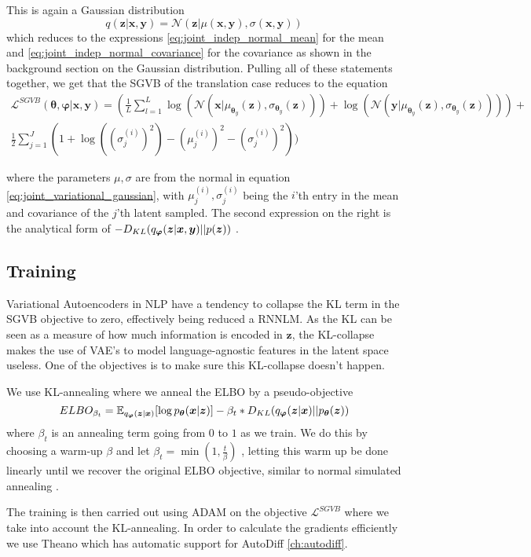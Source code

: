 This is again a Gaussian distribution
\begin{equation}
  \label{eq:joint_variational_gaussian}
  q(\bm{z} | \bm{x}, \bm{y}) = \mathcal{N}(\bm{z} | \mu(\bm{x}, \bm{y}), \sigma(\bm{x}, \bm{y}))
\end{equation} which reduces to the expressions
\eqref{eq:joint_indep_normal_mean} for the mean and
\eqref{eq:joint_indep_normal_covariance} for the covariance as shown in the
background section on the Gaussian distribution.
Pulling all of these statements together, we get that the SGVB of the
translation case reduces to the equation
\begin{equation}
  \begin{split}
  \label{eq:translation_SGVB}
  \mathcal{L}^{SGVB}(\bm{\theta}, \bm{\varphi}| \bm{x}, \bm{y}) = (\frac{1}{L} \sum_{l=1}^L \log(\mathcal{N}(\bm{x} | \mu_{\bm{\theta}_y}(\bm{z}), \sigma_{\bm{\theta}_y}(\bm{z}))) + \log(\mathcal{N}(\bm{y} | \mu_{\bm{\theta}_y}(\bm{z}), \sigma_{\bm{\theta}_y}(\bm{z})))) + \\ \frac{1}{2} \sum_{j=1}^J(1 + \log((\sigma_j^{(i)})^2) - (\mu_j^{(i)})^2 - (\sigma_j^{(i)})^2))
  \end{split}
\end{equation}

where the parameters $\mu, \sigma$ are from the normal in equation
\eqref{eq:joint_variational_gaussian}, with $\mu_j^{(i)}, \sigma_j^{(i)}$ being
the $i$'th entry in the mean and covariance of the $j$'th latent sampled. The
second expression on the right is the analytical form of $-D_{KL}(q_{\bm{\varphi}}(\bm{z} | \bm{x}, \bm{y}) || p(\bm{z}))$ \cite{kingma_auto-encoding_2013}.
\subsection{Training}
Variational Autoencoders in NLP have a tendency to collapse the KL term in the
SGVB objective to zero, effectively being reduced a RNNLM. As the KL can be seen
as a measure of how much information is encoded in $\bm{z}$, the KL-collapse makes the
use of VAE's to model language-agnostic features in the latent space useless.
One of the objectives is to make sure this KL-collapse doesn't happen.

We use KL-annealing where we anneal the ELBO by a pseudo-objective
\begin{equation}
  \label{eq:KL_annealing_ELBO}
  ELBO_{\beta_t} = \operatorname{\mathbb{E}}_{q_{\bm{\varphi}}(\bm{z} | \bm{x})}[\log p_{\bm{\theta}}(\bm{x} | \bm{z})] - \beta_t * D_{KL}(q_{\bm{\varphi}}(\bm{z} | \bm{x}) || p_{\bm{\theta}}(\bm{z}))
\end{equation}
where $\beta_t$ is an annealing term going from $0$ to $1$ as we train. We do
this by choosing a warm-up $\beta$ and let $\beta_t = \min(1, \frac{t}{\beta})$ \cite{bowman_generating_2015},
letting this warm up be done linearly until we recover the original ELBO
objective, similar to normal simulated annealing \cite{Kirkpatrick1983}.

The training is then carried out using ADAM on the objective
$\mathcal{L}^{SGVB}$ where we take into account the KL-annealing. In order to
calculate the gradients efficiently we use Theano which has automatic support
for AutoDiff \ref{ch:autodiff}.